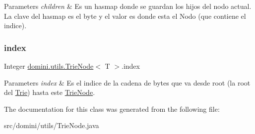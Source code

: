 \begin{DoxyParams}{Parameters}
{\em children} & Es un hasmap donde se guardan los hijos del nodo actual. La clave del hasmap es el byte y el valor es donde esta el Nodo (que contiene el indice). \\
\hline
\end{DoxyParams}
\mbox{\label{classdomini_1_1utils_1_1TrieNode_a9c247bc6568131e5e6ad0758adb67bfa}} 
\subsubsection{\texorpdfstring{index}{index}}
{\footnotesize\ttfamily Integer \hyperlink{classdomini_1_1utils_1_1TrieNode}{domini.\+utils.\+Trie\+Node}$<$ T $>$.index\hspace{0.3cm}{\ttfamily [private]}}


\begin{DoxyParams}{Parameters}
{\em index} & Es el indice de la cadena de bytes que va desde root (la root del \hyperlink{classdomini_1_1utils_1_1Trie}{Trie}) hasta este \hyperlink{classdomini_1_1utils_1_1TrieNode}{Trie\+Node}. \\
\hline
\end{DoxyParams}


The documentation for this class was generated from the following file\+:\begin{DoxyCompactItemize}
\item 
src/domini/utils/Trie\+Node.\+java\end{DoxyCompactItemize}
